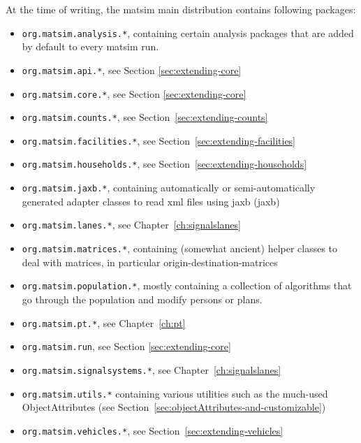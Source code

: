 At the time of writing, the \gls{matsim} main distribution contains following packages:
\begin{itemize}\styleItemize
\item \lstinline{org.matsim.analysis.*}, containing certain analysis packages that are added by default to every \gls{matsim} run.
\item \lstinline{org.matsim.api.*}, see Section \ref{sec:extending-core}
\item \lstinline{org.matsim.core.*}, see Section \ref{sec:extending-core}
\item \lstinline{org.matsim.counts.*}, see Section~\ref{sec:extending-counts}
\item \lstinline{org.matsim.facilities.*}, see Section~\ref{sec:extending-facilities}
\item \lstinline{org.matsim.households.*}, see Section~\ref{sec:extending-households}
\item \lstinline{org.matsim.jaxb.*}, containing automatically or semi-automatically generated adapter classes to read \gls{xml} files using \acrshort{jaxb} (\acrlong{jaxb})
\item \lstinline{org.matsim.lanes.*}, see Chapter~\ref{ch:signalslanes}
\item \lstinline{org.matsim.matrices.*}, containing  (somewhat ancient) helper classes to deal with matrices, in particular origin-destination-matrices
\item \lstinline{org.matsim.population.*}, mostly containing a collection of algorithms that go through the population and modify persons or plans.
\item \lstinline{org.matsim.pt.*}, see Chapter~\ref{ch:pt}
\item \lstinline{org.matsim.run}, see Section \ref{sec:extending-core}
\item \lstinline{org.matsim.signalsystems.*}, see Chapter~\ref{ch:signalslanes}
\item \lstinline{org.matsim.utils.*} containing various utilities such as the much-used ObjectAttributes
(see Section~\ref{sec:objectAttributes-and-customizable})
\item \lstinline{org.matsim.vehicles.*}, see Section~\ref{sec:extending-vehicles}

\end{itemize}
